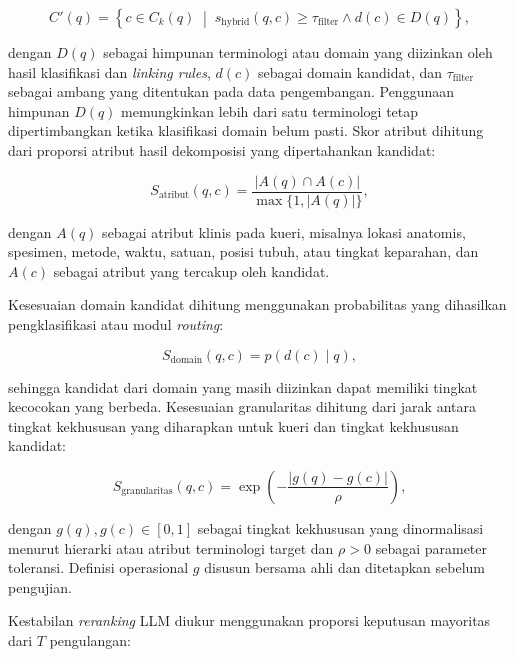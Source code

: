 \begin{equation}
C'(q)=\left\{c\in C_k(q)\;\middle|\;
s_{\mathrm{hybrid}}(q,c)\geq\tau_{\mathrm{filter}}
\land d(c)\in D(q)\right\},
\label{eq:candidate-filtering}
\end{equation}

dengan $D(q)$ sebagai himpunan terminologi atau domain yang diizinkan oleh hasil klasifikasi dan \textit{linking rules}, $d(c)$ sebagai domain kandidat, dan $\tau_{\mathrm{filter}}$ sebagai ambang yang ditentukan pada data pengembangan. Penggunaan himpunan $D(q)$ memungkinkan lebih dari satu terminologi tetap dipertimbangkan ketika klasifikasi domain belum pasti. Skor atribut dihitung dari proporsi atribut hasil dekomposisi yang dipertahankan kandidat:

\begin{equation}
S_{\mathrm{atribut}}(q,c)=
\frac{|A(q)\cap A(c)|}{\max\{1,|A(q)|\}},
\label{eq:attribute-coverage-score}
\end{equation}

dengan $A(q)$ sebagai atribut klinis pada kueri, misalnya lokasi anatomis, spesimen, metode, waktu, satuan, posisi tubuh, atau tingkat keparahan, dan $A(c)$ sebagai atribut yang tercakup oleh kandidat.

Kesesuaian domain kandidat dihitung menggunakan probabilitas yang dihasilkan pengklasifikasi atau modul \textit{routing}:

\begin{equation}
S_{\mathrm{domain}}(q,c)=p\!\left(d(c)\mid q\right),
\label{eq:domain-compatibility-score}
\end{equation}

sehingga kandidat dari domain yang masih diizinkan dapat memiliki tingkat kecocokan yang berbeda. Kesesuaian granularitas dihitung dari jarak antara tingkat kekhususan yang diharapkan untuk kueri dan tingkat kekhususan kandidat:

\begin{equation}
S_{\mathrm{granularitas}}(q,c)=
\exp\!\left(-\frac{|g(q)-g(c)|}{\rho}\right),
\label{eq:granularity-score}
\end{equation}

dengan $g(q),g(c)\in[0,1]$ sebagai tingkat kekhususan yang dinormalisasi menurut hierarki atau atribut terminologi target dan $\rho>0$ sebagai parameter toleransi. Definisi operasional $g$ disusun bersama ahli dan ditetapkan sebelum pengujian.

Kestabilan \textit{reranking} LLM diukur menggunakan proporsi keputusan mayoritas dari $T$ pengulangan:

